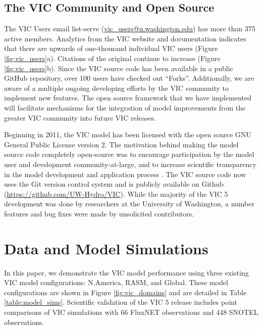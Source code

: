 \documentclass[gmd, manuscript]{copernicus}
\begin{document}
  \subsection{The VIC Community and Open Source}
    \label{sec:vic_community}
    The VIC Users email list-serve (\url{vic_users@u.washington.edu}) has more than 375 active members.
    Analytics from the VIC website and documentation indicates that there are upwards of one-thousand individual VIC users (Figure \ref{fig:vic_users}a).
    Citations of the original \citep{Liang_1994} continue to increase (Figure \ref{fig:vic_users}b).
    Since the VIC source code has been available in a public GitHub repository, over 100 users have checked out ``Forks''.
    Additionally, we are aware of a multiple ongoing developing efforts by the VIC community to implement new features.
    The open source framework that we have implemented will facilitate mechanisms for the integration of model improvements from the greater VIC community into future VIC releases.

    Beginning in 2011, the VIC model has been licensed with the open source GNU General Public License version 2.
    The motivation behind making the model source code completely open-source was to encourage participation by the model user and development community-at-large, and to increase scientific transparency in the model development and application process \citep{Ince_2012}.
    The VIC source code now uses the Git version control system \citep{Torvalds_2010} and is publicly available on Github (\url{https://github.com/UW-Hydro/VIC}).
    While the majority of the VIC 5 development was done by researchers at the University of Washington, a number features and bug fixes were made by unsolicited contributors.

\section{Data and Model Simulations}
  \label{sec:data_and_sims}
  In this paper, we demonstrate the VIC model performance using three existing VIC model configurations: N.America, RASM, and Global.
  These model configurations are shown in Figure \ref{fig:vic_domains} and are detailed in Table \ref{table:model_sims}.
  Scientific validation of the VIC 5 release includes point comparisons of VIC simulations with 66 FluxNET observations and 448 SNOTEL observations.
\end{document}
